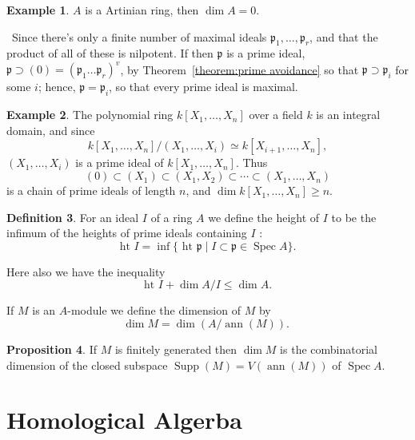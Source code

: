 \documentclass[a4paper,12pt]{article}
\newenvironment{prooff}{{\noindent\it\textcolor{cyan!40!black}{Proof}:}\,}{\par}
\theoremstyle{definition}
\newtheorem{defn}{Definition}[subsection]
\newtheorem{prop}[defn]{Proposition}
\newtheorem{exam}[defn]{Example}
\begin{document}
\begin{exam}
    $A$ is a Artinian ring, then $\dim A=0$.
\end{exam}
\begin{prooff}
    Since there's only a finite number of maximal ideals $\mathfrak{p}_1, \ldots, \mathfrak{p}_r$, and that the product of all of these is nilpotent. If then $\mathfrak{p}$ is a prime ideal, $\mathfrak{p} \supset(0)=\left(\mathfrak{p}_1 \ldots \mathfrak{p}_r\right)^v$, by Theorem~\ref{theorem:prime avoidance} so that $\mathfrak{p} \supset \mathfrak{p}_i$ for some $i$; hence, $\mathfrak{p}=\mathfrak{p}_i$, so that every prime ideal is maximal.
\end{prooff}
\begin{exam}
    The polynomial ring $k\left[X_1, \ldots, X_n\right]$ over a field $k$ is an integral domain, and since
    $$
        k\left[X_1, \ldots, X_n\right] /\left(X_1, \ldots, X_i\right) \simeq k\left[X_{i+1}, \ldots, X_n\right],
    $$
    $\left(X_1, \ldots, X_i\right)$ is a prime ideal of $k\left[X_1, \ldots, X_n\right]$. Thus
    $$
        (0) \subset\left(X_1\right) \subset\left(X_1, X_2\right) \subset \cdots \subset\left(X_1, \ldots, X_n\right)
    $$
    is a chain of prime ideals of length $n$, and $\operatorname{dim} k\left[X_1, \ldots, X_n\right] \geqslant n$.
\end{exam}
\begin{defn}
    For an ideal $I$ of a ring $A$ we define the height of $I$ to be the infimum of the heights of prime ideals containing $I$ :
    $$
        \text { ht } I=\inf \{\text { ht } \mathfrak{p} \mid I \subset \mathfrak{p} \in \operatorname{Spec} A\} \text {. }
    $$

    Here also we have the inequality
    $$
        \text { ht } I+\operatorname{dim} A / I \leqslant \operatorname{dim} A \text {. }
    $$

    If $M$ is an $A$-module we define the dimension of $M$ by
    $$
        \operatorname{dim} M=\operatorname{dim}(A / \operatorname{ann}(M)) \text {. }
    $$
\end{defn}
\begin{prop}
    If $M$ is finitely generated then $\operatorname{dim} M$ is the combinatorial dimension of the closed subspace $\operatorname{Supp}(M)=V(\operatorname{ann}(M))$ of $\operatorname{Spec} A$.
\end{prop}





\newpage
\section{Homological Algerba}
\end{document}
